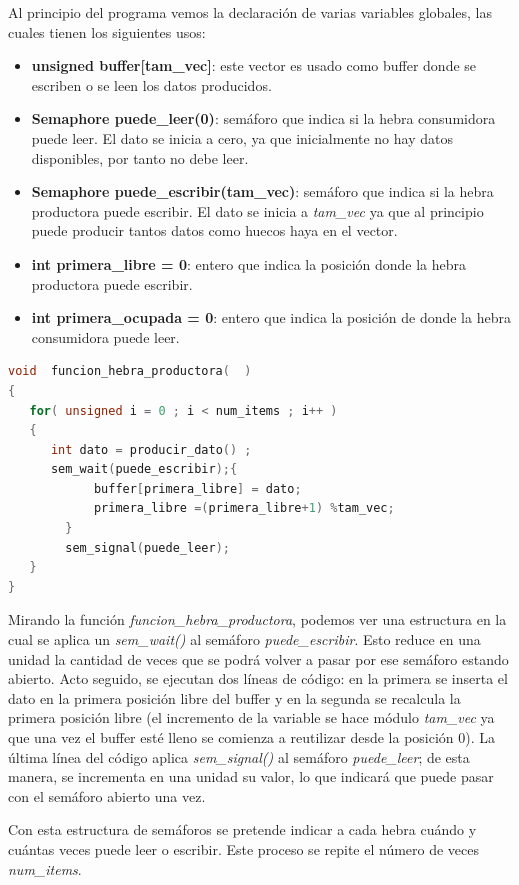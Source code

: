 \documentclass{article}
\begin{document}
Al principio del programa vemos la declaración de varias variables globales, las cuales tienen los siguientes usos: 
\begin{itemize}
    \item \textbf{unsigned buffer[tam\_vec]}: este vector es usado como buffer donde se escriben o se leen los datos producidos.
    \item \textbf{Semaphore puede\_leer(0)}: semáforo que indica si la hebra consumidora puede leer. El dato se inicia a cero, ya que inicialmente no hay datos disponibles, por tanto no debe leer. 
    \item \textbf{Semaphore puede\_escribir(tam\_vec)}: semáforo que indica si la hebra productora puede escribir. El dato se inicia a \textit{tam\_vec} ya que al principio puede producir tantos datos como huecos haya en el vector.
    \item \textbf{int primera\_libre = 0}: entero que indica la posición donde la hebra productora puede escribir.
    \item \textbf{int primera\_ocupada = 0}: entero que indica la posición de donde la hebra consumidora puede leer.
\end{itemize}
\begin{lstlisting}[language=C++,caption=función hebra productora]
void  funcion_hebra_productora(  )
{
   for( unsigned i = 0 ; i < num_items ; i++ )
   {
      int dato = producir_dato() ;
	  sem_wait(puede_escribir);{
			buffer[primera_libre] = dato;
			primera_libre =(primera_libre+1) %tam_vec;
		}
		sem_signal(puede_leer);
   }
}
\end{lstlisting}
Mirando la función \textit{funcion\_hebra\_productora}, podemos ver una estructura en la cual se aplica un \textit{sem\_wait()} al semáforo \textit{puede\_escribir}. Esto reduce en una unidad la cantidad de veces que se podrá volver a pasar por ese semáforo estando abierto. Acto seguido, se ejecutan dos líneas de código: en la primera se inserta el dato en la primera posición libre del buffer y en la segunda se recalcula la primera posición libre (el incremento de la variable se hace módulo \textit{tam\_vec} ya que una vez el buffer esté lleno se comienza a reutilizar desde la posición 0). La última línea del código aplica \textit{sem\_signal()} al semáforo \textit{puede\_leer}; de esta manera, se incrementa en una unidad su valor, lo que indicará que puede pasar con el semáforo abierto una vez. 

Con esta estructura de semáforos se pretende indicar a cada hebra cuándo y cuántas veces puede leer o escribir. Este proceso se repite el número de veces \textit{num\_items}.
\end{document}
